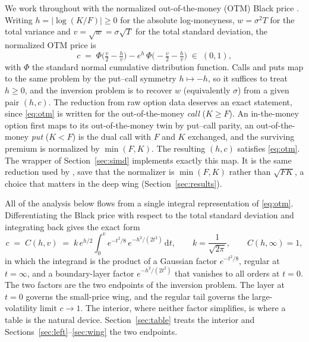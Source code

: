 \documentclass[11pt]{article}
\newcommand{\PhiN}{\Phi}
\begin{document}
We work throughout with the normalized out-of-the-money (OTM) Black price \citep{blackscholes1973,merton1973rational}. Writing $h=|\log(K/F)|\ge0$ for the absolute log-moneyness, $w=\sigma^2T$ for the total variance and $v=\sqrt{w}=\sigma\sqrt{T}$ for the total standard deviation, the normalized OTM price is
\begin{equation}
  c \;=\; \PhiN\!\Big(\tfrac{v}{2}-\tfrac{h}{v}\Big)
        - e^{h}\,\PhiN\!\Big(-\tfrac{v}{2}-\tfrac{h}{v}\Big)
  \;\in\;(0,1),
  \label{eq:otm}
\end{equation}
with $\PhiN$ the standard normal cumulative distribution function. Calls and puts map to the same problem by the put--call symmetry $h\mapsto-h$, so it suffices to treat $h\ge0$, and the inversion problem is to recover $w$ (equivalently $\sigma$) from a given pair $(h,c)$. The reduction from raw option data deserves an exact statement, since \eqref{eq:otm} is written for the out-of-the-money \emph{call} ($K\ge F$). An in-the-money option first maps to its out-of-the-money twin by put--call parity, an out-of-the-money \emph{put} ($K<F$) is the dual call with $F$ and $K$ exchanged, and the surviving premium is normalized by $\min(F,K)$. The resulting $(h,c)$ satisfies \eqref{eq:otm}. The wrapper of Section~\ref{sec:simd} implements exactly this map. It is the same reduction used by \citet{jackel2015rational}, save that the normalizer is $\min(F,K)$ rather than $\sqrt{FK}$, a choice that matters in the deep wing (Section~\ref{sec:results}).

All of the analysis below flows from a single integral representation of \eqref{eq:otm}. Differentiating the Black price with respect to the total standard deviation and integrating back gives the exact form
\begin{equation}
  c \;=\; C(h,v) \;=\; k\,e^{h/2}\int_0^{v} e^{-t^2/8}\,e^{-h^2/(2t^2)}\,\mathrm{d}t,
  \qquad k=\frac{1}{\sqrt{2\pi}},\qquad C(h,\infty)=1,
  \label{eq:baseint}
\end{equation}
in which the integrand is the product of a Gaussian factor $e^{-t^2/8}$, regular at $t=\infty$, and a boundary-layer factor $e^{-h^2/(2t^2)}$ that vanishes to all orders at $t=0$. The two factors are the two endpoints of the inversion problem. The layer at $t=0$ governs the small-price wing, and the regular tail governs the large-volatility limit $c\to1$. The interior, where neither factor simplifies, is where a table is the natural device. Section~\ref{sec:table} treats the interior and Sections~\ref{sec:left}--\ref{sec:wing} the two endpoints.
\end{document}
